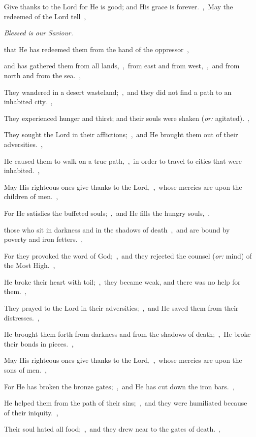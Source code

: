 \documentclass[12pt,twoside,a5paper]{article}
\newcommand{\qanona}[1]{{\liturgicalhint{Qanona.} \emph{#1}}}
\newcommand{\translationoption}[1]{\emph{or:} #1}
\begin{document}
\begin{normalparskip}
  Give thanks to the Lord for He is good; and His grace is forever.~\sep\ May the redeemed of the Lord tell~\sep

  \qanona{Blessed is our Saviour.}

  that He has redeemed them from the hand of the oppressor~\sep

  and has gathered them from all lands,~\sep\ from east and from west,~\sep\ and from north and from the sea.~\sep

  They wandered in a desert wasteland;~\sep\ and they did not find a path to an inhabited city.~\sep

  They experienced hunger and thirst; and their souls were shaken (\translationoption{agitated}).~\sep

  They sought the Lord in their afflictions;~\sep\ and He brought them out of their adversities.~\sep

  He caused them to walk on a true path,~\sep\ in order to travel to cities that were inhabited.~\sep

  May His righteous ones give thanks to the Lord,~\sep\ whose mercies are upon the children of men.~\sep

  For He satisfies the buffeted souls;~\sep\ and He fills the hungry souls,~\sep

  those who sit in darkness and in the shadows of death~\sep\ and are bound by poverty and iron fetters.~\sep

  For they provoked the word of God;~\sep\ and they rejected the counsel (\translationoption{mind}) of the Most High.~\sep

  He broke their heart with toil;~\sep\ they became weak, and there was no help for them.~\sep

  They prayed to the Lord in their adversities;~\sep\ and He saved them from their distresses.~\sep

  He brought them forth from darkness and from the shadows of death;~\sep\ He broke their bonds in pieces.~\sep

  May His righteous ones give thanks to the Lord,~\sep\ whose mercies are upon the sons of men.~\sep

  For He has broken the bronze gates;~\sep\ and He has cut down the iron bars.~\sep

  He helped them from the path of their sins;~\sep\ and they were humiliated because of their iniquity.~\sep

  Their soul hated all food;~\sep\ and they drew near to the gates of death.~\sep


\end{normalparskip}
\end{document}
